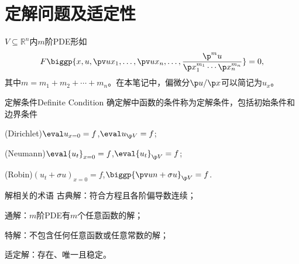 \section{定解问题及适定性}
$V\subseteq\mathbb R^n$内$m$阶PDE形如
\[
	F\biggp{x,u,\pv u{x_1},\ldots,\pv u{x_n},\ldots,\frac{\p^mu}{\p x_1^{m_1}\cdots\p x_n^{m_n}}}=0,
\]
其中$m=m_1+m_2+\cdots+m_n$。在本笔记中，偏微分$\p u/\p x$可以简记为$u_x$。
\begin{definition}{定解条件}{Definite Condition}
	确定解中函数的条件称为定解条件，包括初始条件和边界条件
	\begin{compactenum}[I.]
		\item (Dirichlet)\quad$\eval u_{x=0}=f$,\qqqquad$\eval u_{\p V}=f$;
		\item (Neumann)\enspace$\eval{u_t}_{x=0}=f$,\qqqquad\!$\eval{u_t}_{\p V}=f$;
		\item (Robin)\qquad$(u_t+\sigma u)_{x=0}=f$,\quad$\biggp{\pv un+\sigma u}_{\p V}=f$.
	\end{compactenum}
\end{definition}
\begin{definition}{解相关的术语}{}
	古典解：符合方程且各阶偏导数连续；

	通解：$m$阶PDE有$m$个任意函数的解；

	特解：不包含任何任意函数或任意常数的解；

	适定解：存在、唯一且稳定。
\end{definition}
